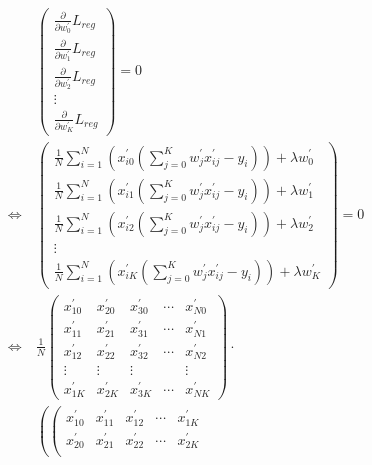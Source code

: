 \documentclass{article}
\begin{document}
\begin{align*}
    &\left(
    \begin{array}{c}
        \frac{\partial}{\partial w_0^\prime} L_{reg}\\
        \frac{\partial}{\partial w_1^\prime} L_{reg}\\
        \frac{\partial}{\partial w_2^\prime} L_{reg}\\
        \vdots\\
        \frac{\partial}{\partial w_K^\prime} L_{reg} 
    \end{array}
    \right)
    = 0\\
    \Leftrightarrow
    &\left(
    \begin{array}{c}
        \frac{1}{N} \sum_{i = 1}^{N} (x_{i0}^\prime(\sum_{j = 0}^{K} w_j^\prime x_{ij}^\prime - y_i)) + \lambda w_0^\prime\\
        \frac{1}{N} \sum_{i = 1}^{N} (x_{i1}^\prime(\sum_{j = 0}^{K} w_j^\prime x_{ij}^\prime - y_i)) + \lambda w_1^\prime\\
        \frac{1}{N} \sum_{i = 1}^{N} (x_{i2}^\prime(\sum_{j = 0}^{K} w_j^\prime x_{ij}^\prime - y_i)) + \lambda w_2^\prime\\
        \vdots\\
        \frac{1}{N} \sum_{i = 1}^{N} (x_{iK}^\prime(\sum_{j = 0}^{K} w_j^\prime x_{ij}^\prime - y_i)) + \lambda w_K^\prime
    \end{array}
    \right)
    = 0\\
    \Leftrightarrow\ 
    &\frac{1}{N} \left(
    \begin{array}{ccccc}
        x_{10}^\prime & x_{20}^\prime & x_{30}^\prime & \cdots & x_{N0}^\prime\\
        x_{11}^\prime & x_{21}^\prime & x_{31}^\prime & \cdots & x_{N1}^\prime\\
        x_{12}^\prime & x_{22}^\prime & x_{32}^\prime & \cdots & x_{N2}^\prime\\
        \vdots & \vdots & \vdots & \  & \vdots\\
        x_{1K}^\prime & x_{2K}^\prime & x_{3K}^\prime & \cdots & x_{NK}^\prime
    \end{array}
    \right)
    \cdot \\
    &\left(
    \left(
    \begin{array}{ccccc}
        x_{10}^\prime & x_{11}^\prime & x_{12}^\prime & \cdots & x_{1K}^\prime\\
        x_{20}^\prime & x_{21}^\prime & x_{22}^\prime & \cdots & x_{2K}^\prime\\

\end{array}
\end{align*}
\end{document}
